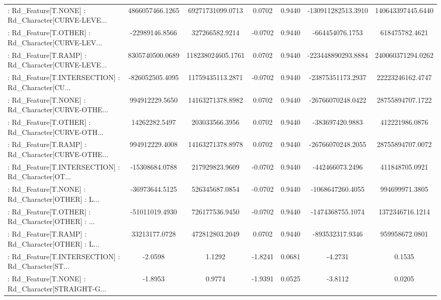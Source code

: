 \begin{longtable}{p{4cm}cccccc}
 : Rd\_Feature[T.NONE] : Rd\_Character[CURVE-LEVE... &   4866057466.1265 &  69271731099.0713 &  0.0702 &       0.9440 & -130911282513.3910 & 140643397445.6440 \\
 : Rd\_Feature[T.OTHER] : Rd\_Character[CURVE-LEV... &    -22989146.8566 &    327266582.9214 & -0.0702 &       0.9440 &    -664454076.1753 &    618475782.4621 \\
 : Rd\_Feature[T.RAMP] : Rd\_Character[CURVE-LEVE... &   8305740500.0689 & 118238024605.1761 &  0.0702 &       0.9440 & -223448890293.8884 & 240060371294.0262 \\
 : Rd\_Feature[T.INTERSECTION] : Rd\_Character[CU... &   -826052505.4095 &  11759435113.2871 & -0.0702 &       0.9440 &  -23875351173.2937 &  22223246162.4747 \\
 : Rd\_Feature[T.NONE] : Rd\_Character[CURVE-OTHE... &    994912229.5650 &  14163271378.8982 &  0.0702 &       0.9440 &  -26766070248.0422 &  28755894707.1722 \\
 : Rd\_Feature[T.OTHER] : Rd\_Character[CURVE-OTH... &     14262282.5497 &    203033566.3956 &  0.0702 &       0.9440 &    -383697420.9883 &    412221986.0876 \\
 : Rd\_Feature[T.RAMP] : Rd\_Character[CURVE-OTHE... &    994912229.4008 &  14163271378.8978 &  0.0702 &       0.9440 &  -26766070248.2055 &  28755894707.0072 \\
 : Rd\_Feature[T.INTERSECTION] : Rd\_Character[OT... &    -15308684.0788 &    217929823.9609 & -0.0702 &       0.9440 &    -442466073.2496 &    411848705.0921 \\
 : Rd\_Feature[T.NONE] : Rd\_Character[OTHER] : L... &    -36973644.5125 &    526345687.0854 & -0.0702 &       0.9440 &   -1068647260.4055 &    994699971.3805 \\
 : Rd\_Feature[T.OTHER] : Rd\_Character[OTHER] : ... &    -51011019.4930 &    726177536.9450 & -0.0702 &       0.9440 &   -1474368755.1074 &   1372346716.1214 \\
 : Rd\_Feature[T.RAMP] : Rd\_Character[OTHER] : L... &     33213177.0728 &    472812803.2049 &  0.0702 &       0.9440 &    -893532317.9346 &    959958672.0801 \\
 : Rd\_Feature[T.INTERSECTION] : Rd\_Character[ST... &           -2.0598 &            1.1292 & -1.8241 &       0.0681 &            -4.2731 &            0.1535 \\
 : Rd\_Feature[T.NONE] : Rd\_Character[STRAIGHT-G... &           -1.8953 &            0.9774 & -1.9391 &       0.0525 &            -3.8112 &            0.0205 \\

\end{longtable}
